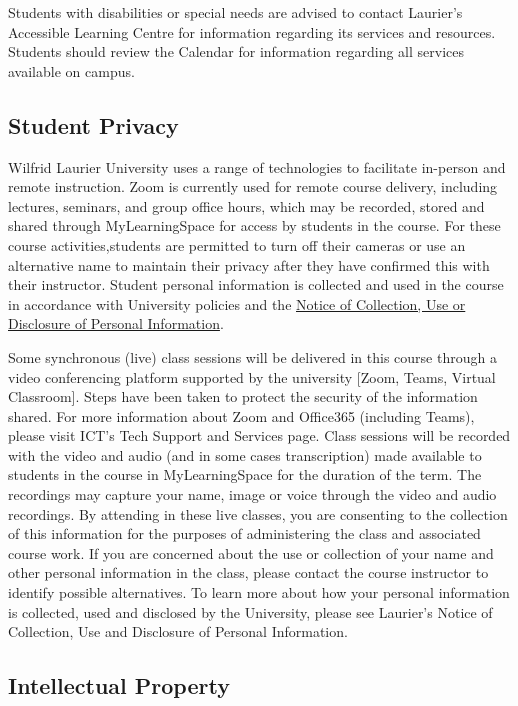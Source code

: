 \documentclass[
  letterpaper,
  DIV=11,
  numbers=noendperiod]{scrartcl}
\begin{document}
Students with disabilities or special needs are advised to contact
Laurier's Accessible Learning Centre for information regarding its
services and resources. Students should review the Calendar for
information regarding all services available on campus.

\hypertarget{student-privacy}{%
\subsection{Student Privacy}\label{student-privacy}}

Wilfrid Laurier University uses a range of technologies to facilitate
in-person and remote instruction. Zoom is currently used for remote
course delivery, including lectures, seminars, and group office hours,
which may be recorded, stored and shared through MyLearningSpace for
access by students in the course. For these course activities,students
are permitted to turn off their cameras or use an alternative name to
maintain their privacy after they have confirmed this with their
instructor. Student personal information is collected and used in the
course in accordance with University policies and the
\href{https://www.wlu.ca/about/public-accountability/privacy/notice-of-collection.html}{Notice
of Collection, Use or Disclosure of Personal Information}.

Some synchronous (live) class sessions will be delivered in this course
through a video conferencing platform supported by the university
{[}Zoom, Teams, Virtual Classroom{]}. Steps have been taken to protect
the security of the information shared. For more information about Zoom
and Office365 (including Teams), please visit ICT's Tech Support and
Services page. Class sessions will be recorded with the video and audio
(and in some cases transcription) made available to students in the
course in MyLearningSpace for the duration of the term. The recordings
may capture your name, image or voice through the video and audio
recordings. By attending in these live classes, you are consenting to
the collection of this information for the purposes of administering the
class and associated course work. If you are concerned about the use or
collection of your name and other personal information in the class,
please contact the course instructor to identify possible alternatives.
To learn more about how your personal information is collected, used and
disclosed by the University, please see Laurier's Notice of Collection,
Use and Disclosure of Personal Information.

\hypertarget{intellectual-property}{%
\subsection{Intellectual Property}\label{intellectual-property}}
\end{document}
